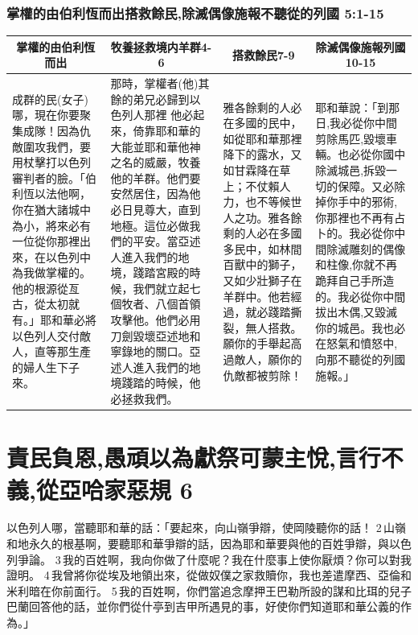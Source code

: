 \subsubsection{掌權的由伯利恆而出搭救餘民,除滅偶像施報不聽從的列國 5:1-15}
\begin{table}[H]
\centering
\begin{tabular}{p{3.75cm}|p{5cm}|p{3.75cm}|p{4.150cm}}\hline\hline
\multicolumn{1}{c|}{掌權的由伯利恆而出}&\multicolumn{1}{c|}{牧養拯救境内羊群4-6}&\multicolumn{1}{c|}{搭救餘民7-9}&\multicolumn{1}{c}{除滅偶像施報列國10-15}\\\hline
成群的民(女子)哪，現在你要聚集成隊！因為仇敵圍攻我們，要用杖擊打以色列審判者的臉。「伯利恆以法他啊，你在猶大諸城中為小，將來必有一位從你那裡出來，在以色列中為我做掌權的。他的根源從亙古，從太初就有。」耶和華必將以色列人交付敵人，直等那生產的婦人生下子來。
&\multirow{1}{5.25cm}{那時，掌權者(他)其餘的弟兄必歸到以色列人那裡
他必起來，倚靠耶和華的大能並耶和華他神之名的威嚴，牧養他的羊群。他們要安然居住，因為他必日見尊大，直到地極。這位必做我們的平安。當亞述人進入我們的地境，踐踏宮殿的時候，我們就立起七個牧者、八個首領攻擊他。他們必用刀劍毀壞亞述地和寧錄地的關口。亞述人進入我們的地境踐踏的時候，他必拯救我們。}
&\multirow{1}{4.cm}{雅各餘剩的人必在多國的民中，如從耶和華那裡降下的露水，又如甘霖降在草上；不仗賴人力，也不等候世人之功。雅各餘剩的人必在多國多民中，如林間百獸中的獅子，又如少壯獅子在羊群中。他若經過，就必踐踏撕裂，無人搭救。願你的手舉起高過敵人，願你的仇敵都被剪除！}
&耶和華說：「到那日,我必從你中間剪除馬匹,毀壞車輛。也必從你國中除滅城邑,拆毀一切的保障。又必除掉你手中的邪術,你那裡也不再有占卜的。我必從你中間除滅雕刻的偶像和柱像,你就不再跪拜自己手所造的。我必從你中間拔出木偶,又毀滅你的城邑。我也必在怒氣和憤怒中,向那不聽從的列國施報。」\\\hline
\end{tabular}
\end{table}



\section{責民負恩,愚頑以為獻祭可蒙主悅,言行不義,從亞哈家惡規 6}

以色列人哪，當聽耶和華的話：「要起來，向山嶺爭辯，使岡陵聽你的話！ 2 山嶺和地永久的根基啊，要聽耶和華爭辯的話，因為耶和華要與他的百姓爭辯，與以色列爭論。 3 我的百姓啊，我向你做了什麼呢？我在什麼事上使你厭煩？你可以對我證明。 4 我曾將你從埃及地領出來，從做奴僕之家救贖你，我也差遣摩西、亞倫和米利暗在你前面行。 5 我的百姓啊，你們當追念摩押王巴勒所設的謀和比珥的兒子巴蘭回答他的話，並你們從什亭到吉甲所遇見的事，好使你們知道耶和華公義的作為。」

